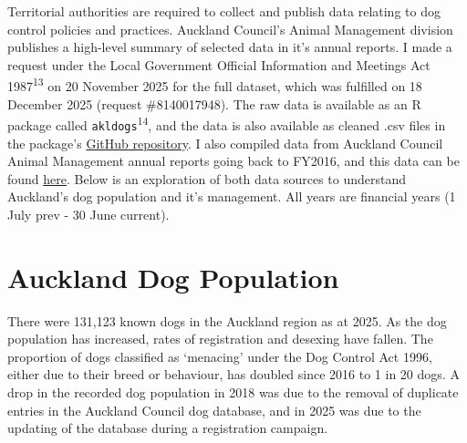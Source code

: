 \documentclass[
  letterpaper,
  DIV=11,
  numbers=noendperiod]{scrartcl}
\begin{document}
Territorial authorities are required to collect and publish data
relating to dog control policies and practices. Auckland Council's
Animal Management division publishes a high-level summary of selected
data in it's annual reports. I made a request under the Local Government
Official Information and Meetings Act 1987\textsuperscript{13} on 20
November 2025 for the full dataset, which was fulfilled on 18 December
2025 (request \#8140017948). The raw data is available as an R package
called \texttt{akldogs}\textsuperscript{14}, and the data is also
available as cleaned .csv files in the package's
\href{https://github.com/tesaunders/akldogs/tree/main/data-raw}{GitHub
repository}. I also compiled data from Auckland Council Animal
Management annual reports going back to FY2016, and this data can be
found \href{./data}{here}. Below is an exploration of both data sources
to understand Auckland's dog population and it's management. All years
are financial years (1 July prev - 30 June current).

\section{Auckland Dog Population}\label{auckland-dog-population}

There were 131,123 known dogs in the Auckland region as at 2025. As the
dog population has increased, rates of registration and desexing have
fallen. The proportion of dogs classified as `menacing' under the Dog
Control Act 1996, either due to their breed or behaviour, has doubled
since 2016 to 1 in 20 dogs. A drop in the recorded dog population in
2018 was due to the removal of duplicate entries in the Auckland Council
dog database, and in 2025 was due to the updating of the database during
a registration campaign.
\end{document}
